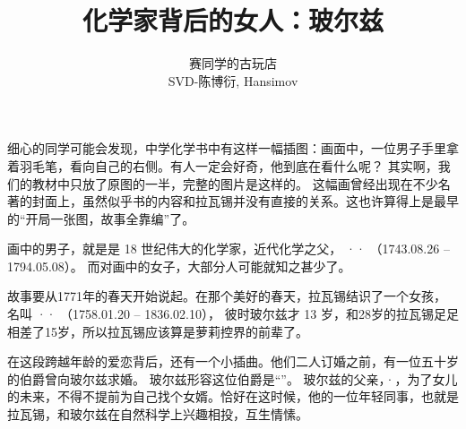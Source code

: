 \documentclass[a4paper]{article}
\title{化学家背后的女人：玻尔兹}
\author{赛同学的古玩店 \\ SVD-陈博衍, Hansimov}
\begin{document}
\maketitle

细心的同学可能会发现，中学化学书中有这样一幅插图：画面中，一位男子手里拿着羽毛笔，看向自己的右侧。有人一定会好奇，他到底在看什么呢？
其实啊，我们的教材中只放了原图的一半，完整的图片是这样的。
这幅画曾经出现在不少名著的封面上，虽然似乎书的内容和拉瓦锡并没有直接的关系。这也许算得上是最早的“开局一张图，故事全靠编”了。


画中的男子，就是是 18 世纪伟大的化学家，近代化学之父，
\os{}{-}··
（1743.08.26 – 1794.05.08）。
而对画中的女子，大部分人可能就知之甚少了。

故事要从1771年的春天开始说起。在那个美好的春天，拉瓦锡结识了一个女孩，
名叫 \os{}{-}··
（1758.01.20 – 1836.02.10），
彼时玻尔兹才 13 岁，和28岁的拉瓦锡足足相差了15岁，所以拉瓦锡应该算是萝莉控界的前辈了。

在这段跨越年龄的爱恋背后，还有一个小插曲。他们二人订婚之前，有一位五十岁的伯爵曾向玻尔兹求婚。
玻尔兹形容这位伯爵是“”。
玻尔兹的父亲，·，为了女儿的未来，不得不提前为自己找个女婿。恰好在这时候，他的一位年轻同事，也就是拉瓦锡，和玻尔兹在自然科学上兴趣相投，互生情愫。
\end{document}
